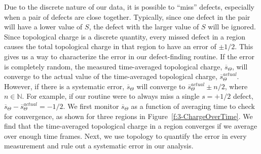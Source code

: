 Due to the discrete nature of our data, it is possible to ``miss'' defects, especially when a pair of defects are close together.
Typically, since one defect in the pair will have a lower value of $S$, the defect with the larger value of $S$ will be ignored.
Since topological charge is a discrete quantity, every missed defect in a region causes the total topological charge in that region to have an error of $\pm 1/2$.
This gives us a way to characterize the error in our defect-finding routine.
If the error is completely random, the measured time-averaged topological charge, $\overbar{s}_{\Theta}$, will converge to the actual value of the time-averaged topological charge, $\overbar{s}_{\Theta}^{actual}$.
However, if there is a systematic error, $\overbar{s}_{\Theta}$ will converge to $\overbar{s}_{\Theta}^{actual} \pm n/2$, where $n \in \mathbb{N}$.
For example, if our routine were to always miss a single $s = +1/2$ defect, $\overbar{s}_{\Theta} - \overbar{s}_{\Theta}^{actual} = -1/2$.
We first monitor $\overbar{s}_{\Theta}$ as a function of averaging time to check for convergence, as shown for three regions in Figure~\ref{f:3-ChargeOverTime}.
We find that the time-averaged topological charge in a region converges if we average over enough time frames.
Next, we use topology to quantify the error in every measurement and rule out a systematic error in our analysis.
